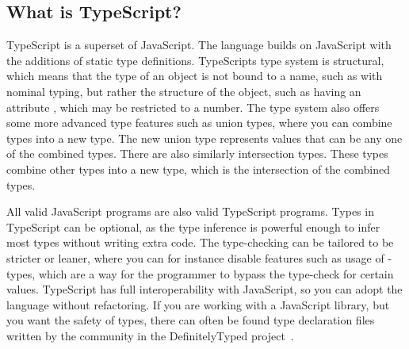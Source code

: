 \subsection{What is TypeScript?}\label{subsec:what-is-typescript}

TypeScript is a superset of JavaScript.
The language builds on JavaScript with the additions of static type definitions.
TypeScripts type system is structural, which means that the type of an object is not bound to a name, such as with nominal typing, but rather the structure of the object, such as having an attribute , which may be restricted to a number.
The type system also offers some more advanced type features such as union types, where you can combine types into a new type.
The new union type represents values that can be any one of the combined types.
There are also similarly intersection types.
These types combine other types into a new type, which is the intersection of the combined types.

All valid JavaScript programs are also valid TypeScript programs.
Types in TypeScript can be optional, as the type inference is powerful enough to infer most types without writing extra code.
The type-checking can be tailored to be stricter or leaner, where you can for instance disable features such as usage of -types, which are a way for the programmer to bypass the type-check for certain values.
TypeScript has full interoperability with JavaScript, so you can adopt the language without refactoring.
If you are working with a JavaScript library, but you want the safety of types, there can often be found type declaration files written by the community in the DefinitelyTyped project~\cite{tswebsite}.

